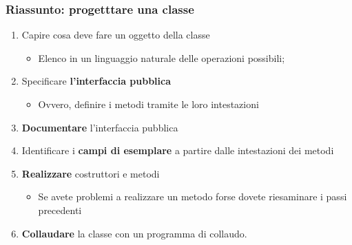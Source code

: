 \begin{frame}
\frametitle{Riassunto: progetttare una classe}
\begin{block}{}
\begin{enumerate}
\item \alert{Capire} cosa deve fare un oggetto della classe
\begin{itemize}
\item Elenco in un linguaggio naturale delle operazioni possibili;
\end{itemize}
\item Specificare \textbf{\alert{l'interfaccia pubblica}}
\begin{itemize}
\item Ovvero, definire i metodi tramite le loro intestazioni
\end{itemize}
\item \textbf{\alert{Documentare}} l'interfaccia pubblica
\item Identificare i \textbf{\alert{campi di esemplare}} a partire dalle intestazioni dei metodi
\item \textbf{\alert{Realizzare}} costruttori e metodi
\begin{itemize}
\item Se avete problemi a realizzare un metodo forse dovete riesaminare i passi precedenti
\end{itemize}
\item \textbf{\alert{Collaudare}} la classe con un programma di collaudo.
\end{enumerate}
\end{block}
\end{frame}

